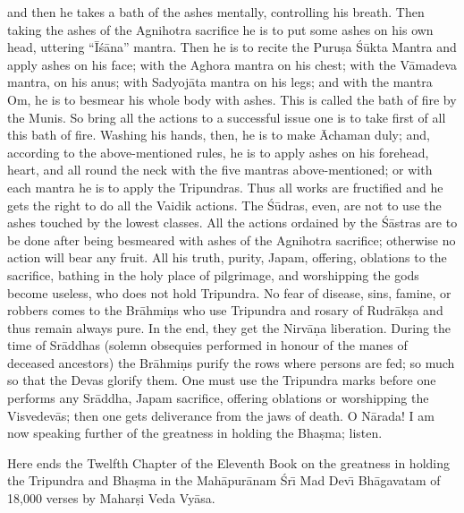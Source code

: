 and then he takes a bath of the ashes mentally, controlling his breath. Then taking the ashes of the Agnihotra sacrifice he is to put some ashes on his own head, uttering ``\=I\'s\=ana'' mantra. Then he is to recite the Puru\d{s}a \'S\=ukta Mantra and apply ashes on his face; with the Aghora mantra on his chest; with the V\=amadeva mantra, on his anus; with Sadyoj\=ata mantra on his legs; and with the mantra Om, he is to besmear his whole body with ashes. This is called the bath of fire by the Munis. So bring all the actions to a successful issue one is to take first of all this bath of fire. Washing his hands, then, he is to make \=Achaman duly; and, according to the above-mentioned rules, he is to apply ashes on his forehead, heart, and all round the neck with the five mantras above-mentioned; or with each mantra he is to apply the Tripundras. Thus all works are fructified and he gets the right to do all the Vaidik actions. The \'S\=udras, even, are not to use the ashes touched by the lowest classes. All the actions ordained by the \'S\=astras are to be done after being besmeared with ashes of the Agnihotra sacrifice; otherwise no action will bear any fruit. All his truth, purity, Japam, offering, oblations to the sacrifice, bathing in the holy place of pilgrimage, and worshipping the gods become useless, who does not hold Tripundra. No fear of disease, sins, famine, or robbers comes to the Br\=ahmi\d{n}s who use Tripundra and rosary of Rudr\=ak\d{s}a and thus remain always pure. In the end, they get the Nirv\=a\d{n}a liberation. During the time of Sr\=addhas (solemn obsequies performed in honour of the manes of deceased ancestors) the Br\=ahmi\d{n}s purify the rows where persons are fed; so much so that the Devas glorify them. One must use the Tripundra marks before one performs any Sr\=addha, Japam sacrifice, offering oblations or worshipping the Visvedev\=as; then one gets deliverance from the jaws of death. O N\=arada! I am now speaking further of the greatness in holding the Bha\d{s}ma; listen.

Here ends the Twelfth Chapter of the Eleventh Book on the greatness in holding the Tripundra and Bha\d{s}ma in the Mah\=apur\=anam \'Sr\={\i} Mad Dev\={\i} Bh\=agavatam of 18,000 verses by Mahar\d{s}i Veda Vy\=asa.



